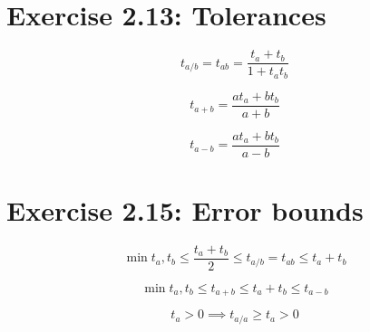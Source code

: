 \documentclass[12pt]{article}
\begin{document}
\section{Exercise 2.13: Tolerances}

\[
    t_{a/b} = t_{ab} = \frac{t_a + t_b}{1 + t_a t_b}
\]

\[
    t_{a+b} = \frac{at_a + bt_b}{a+b}
\]

\[
    t_{a-b} = \frac{at_a + bt_b}{a-b}
\]

\section{Exercise 2.15: Error bounds}

\[
    \min{t_a,t_b} \le \frac{t_a + t_b}{2} \le t_{a/b} = t_{ab} \le t_a + t_b
\]

\[
    \min{t_a,t_b} \le t_{a+b} \le t_a + t_b \le t_{a-b}
\]

\[
    t_a > 0 \implies t_{a/a} \ge t_a > 0
\]
\end{document}
